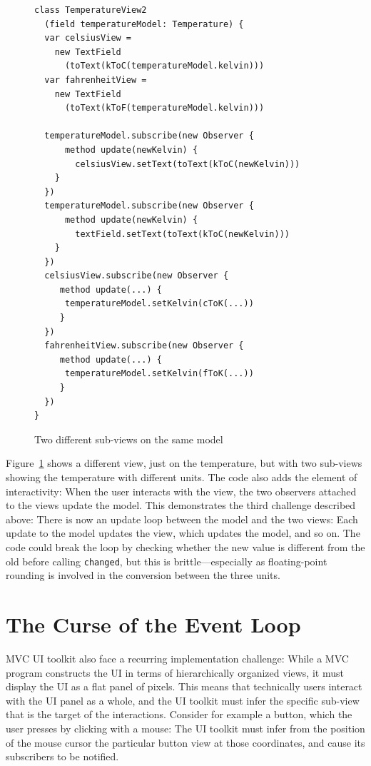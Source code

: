 \documentclass[sigplan,review,screen]{acmart}
\begin{document}
\begin{figure}[tb]
\begin{verbatim}
class TemperatureView2
  (field temperatureModel: Temperature) {
  var celsiusView =
    new TextField
      (toText(kToC(temperatureModel.kelvin)))
  var fahrenheitView =
    new TextField
      (toText(kToF(temperatureModel.kelvin)))

  temperatureModel.subscribe(new Observer {
      method update(newKelvin) {
        celsiusView.setText(toText(kToC(newKelvin)))
    }
  })
  temperatureModel.subscribe(new Observer {
      method update(newKelvin) {
        textField.setText(toText(kToC(newKelvin)))
    }
  })
  celsiusView.subscribe(new Observer {
     method update(...) {
      temperatureModel.setKelvin(cToK(...))
     }
  })
  fahrenheitView.subscribe(new Observer {
     method update(...) {
      temperatureModel.setKelvin(fToK(...))
     }
  })
}
\end{verbatim}
  \caption{Two different sub-views on the same model}
  \label{fig:temperature-view2}
\end{figure}
%
Figure~\ref{fig:temperature-view2} shows a different view, just on the
temperature, but with two sub-views showing the temperature with
different units.  The code also adds the element of interactivity:
When the user interacts with the view, the two observers attached to
the views update the model.  This demonstrates the third challenge
described above: There is now an update loop between the model and
the two views: Each update to the model updates the view, which
updates the model, and so on.  The code could break the loop by
checking whether the new value is different from the old before
calling \texttt{changed}, but this is brittle---especially as
floating-point rounding is involved in the conversion between the
three units.

\section{The Curse of the Event Loop}
\label{sec:event-loop}

MVC UI toolkit also face a recurring implementation challenge: While a
MVC program constructs the UI in terms of hierarchically organized
views, it must display the UI as a flat panel of pixels.  This means
that technically users interact with the UI panel as a whole, and the
UI toolkit must infer the specific sub-view that is the target of the interactions.
Consider for example a button, which the user presses by clicking with
a mouse: The UI toolkit must infer from the position of the mouse
cursor the particular button view at those coordinates, and cause its
subscribers to be notified.
\end{document}
